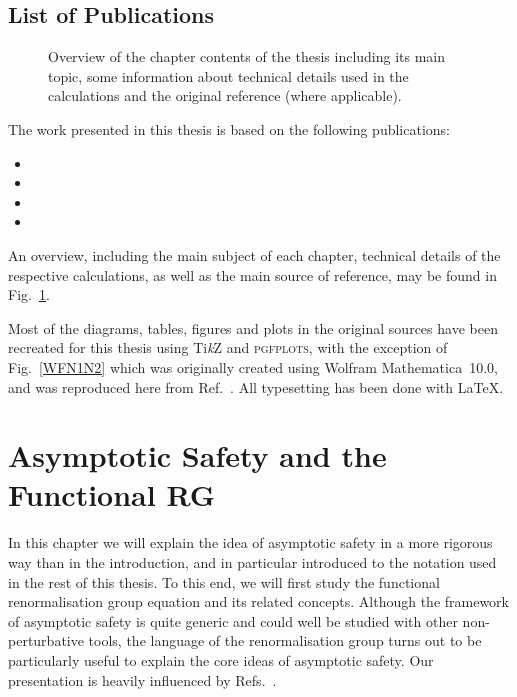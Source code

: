 \documentclass[11pt]{book}
\newcommand{\TikZ}{Ti\emph{k}Z }
\newcommand{\pgfplots}{\textsc{pgfplots}}
\numberwithin{equation}{chapter}
\begin{document}
\section*{List of Publications}

\begin{figure}
  \begin{center}
    
  \end{center}
  \caption{
    Overview of the chapter contents of the thesis including its main topic, some information
    about technical details used in the calculations and the original reference (where applicable).
  }
  \label{fig:overview}
\end{figure}

The work presented in this thesis is based on the following publications:%
\bigskip
\begin{itemize}
  \setlength\itemsep{0.7em}
  \item {}
  \item {}
  \item {}
  \item {}
\end{itemize}
\bigskip
An overview, including the main subject of each chapter, technical details
of the respective calculations, as well as the main source of reference, may be found in
Fig.~\ref{fig:overview}.

Most of the diagrams, tables, figures and plots in the original
sources have been recreated for this thesis using \TikZ and \pgfplots, with the exception
of Fig.~\ref{WFN1N2} which was originally created using Wolfram Mathematica~10.0,
and was reproduced here from Ref.~\cite{Labus:2015ska}.
All typesetting has been done with \LaTeX.



\mainmatter
\chapter[Asymptotic Safety and the Functional Renormalisation Group]{Asymptotic Safety and the Functional RG}

In this chapter we will explain the idea of asymptotic safety in a
more rigorous way than in the introduction,
and in particular introduced to the notation
used in the rest of this thesis.
To this end, we will first study the functional renormalisation group
equation and its related concepts.
Although the framework of asymptotic safety is quite generic
and could well be studied with other non-perturbative tools, the
language of the renormalisation group turns out to be particularly useful
to explain the core ideas of asymptotic safety.
Our presentation is heavily influenced by
Refs.~\cite{Percacci:2011fr, percacci2017introduction}.
\end{document}
